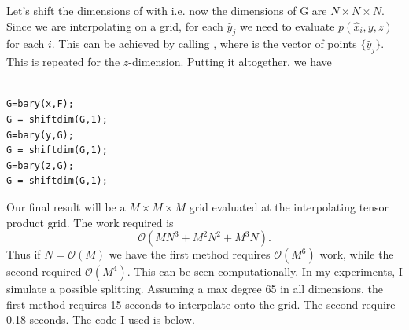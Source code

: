 \documentclass{article}
\begin{document}
Let's shift the dimensions of  with  i.e. now the dimensions of G are $N \times N \times N$. Since we are interpolating on a grid, for each $\hat{y}_j$ we need to evaluate $p(\hat{x}_i,y,z)$ for each $i$. This can be achieved by calling , where  is the vector of points $\{\hat{y}_j\}$. This is repeated for the $z$-dimension. Putting it altogether, we have
\begin{lstlisting}[frame=single]  % Start your code-block

G=bary(x,F);
G = shiftdim(G,1);
G=bary(y,G);
G = shiftdim(G,1);
G=bary(z,G);
G = shiftdim(G,1);
\end{lstlisting}
Our final result will be a $M \times M \times M$ grid evaluated at the interpolating tensor product grid. The work required is
 \begin{equation}
 \mathcal{O}(M N^3 + M^2 N^2 + M^3 N).
 \end{equation}
 Thus if $N =\mathcal{O}(M)$ we have the first method requires $\mathcal{O}(M^6)$ work, while the second required $\mathcal{O}(M^4)$. This can be seen computationally. In my experiments, I simulate a possible splitting. Assuming a max degree 65 in all dimensions, the first method requires 15 seconds to interpolate onto the grid. The second require 0.18 seconds. The code I used is below.
 
\end{document}
